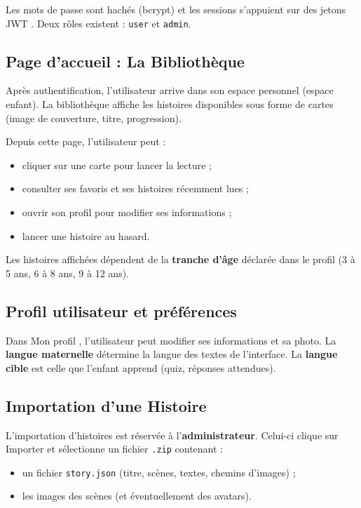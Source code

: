 \documentclass[12pt,twoside,letterpaper]{article}
\begin{document}
Les mots de passe sont hach\'es (bcrypt) et les sessions s'appuient sur des jetons JWT \cite{rfc7519}.
Deux r\^oles existent : \texttt{user} et \texttt{admin}.

\subsection{Page d'accueil : La Biblioth\`eque}

Apr\`es authentification, l'utilisateur arrive dans son espace personnel (espace enfant).
La biblioth\`eque affiche les histoires disponibles sous forme de cartes
(image de couverture, titre, progression).

Depuis cette page, l'utilisateur peut :
\begin{itemize}[leftmargin=*]
  \item cliquer sur une carte pour lancer la lecture ;
  \item consulter ses favoris et ses histoires r\'ecemment lues ;
  \item ouvrir son profil pour modifier ses informations ;
  \item lancer une histoire au hasard.
\end{itemize}

Les histoires affich\'ees d\'ependent de la \textbf{tranche d'\^age}
d\'eclar\'ee dans le profil (3 \`a 5 ans, 6 \`a 8 ans, 9 \`a 12 ans).

\subsection{Profil utilisateur et pr\'ef\'erences}

Dans \og Mon profil \fg{}, l'utilisateur peut modifier ses informations et sa photo.
La \textbf{langue maternelle} d\'etermine la langue des textes de l'interface.
La \textbf{langue cible} est celle que l'enfant apprend (quiz, r\'eponses attendues).

\subsection{Importation d'une Histoire}

L'importation d'histoires est r\'eserv\'ee \`a l'\textbf{administrateur}.
Celui-ci clique sur \og Importer \fg{} et s\'electionne un fichier \texttt{.zip} contenant :
\begin{itemize}[leftmargin=*]
  \item un fichier \texttt{story.json} (titre, sc\`enes, textes, chemins d'images) ;
  \item les images des sc\`enes (et \'eventuellement des avatars).
\end{itemize}
\end{document}
